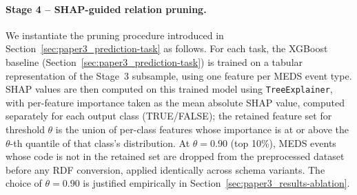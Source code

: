 \paragraph{Stage 4 -- SHAP-guided relation pruning.}
We instantiate the pruning procedure introduced in Section~\ref{sec:paper3_prediction-task} as follows. For each task, the XGBoost baseline (Section~\ref{sec:paper3_prediction-task}) is trained on a tabular representation of the Stage~3 subsample, using one feature per MEDS event type. %
SHAP values are then computed on this trained model using \texttt{TreeExplainer}, with per-feature importance taken as the mean absolute SHAP value, computed separately for each output class (TRUE/FALSE); the retained feature set for threshold $\theta$ is the union of per-class features whose importance is at or above the $\theta$-th quantile of that class's distribution. At $\theta = 0.90$ (top 10\%), MEDS events whose code is not in the retained set are dropped from the preprocessed dataset before any RDF conversion, applied identically across schema variants. The choice of $\theta = 0.90$ is justified empirically in Section~\ref{sec:paper3_results-ablation}.


